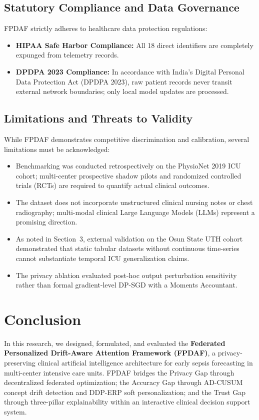 \documentclass[final,5p,times,twocolumn]{elsarticle}
\begin{document}
\subsection{Statutory Compliance and Data Governance}
FPDAF strictly adheres to healthcare data protection regulations:
\begin{itemize}
    \item \textbf{HIPAA Safe Harbor Compliance:} All 18 direct identifiers are completely expunged from telemetry records.
    \item \textbf{DPDPA 2023 Compliance:} In accordance with India's Digital Personal Data Protection Act (DPDPA 2023), raw patient records never transit external network boundaries; only local model updates are processed.
\end{itemize}

\subsection{Limitations and Threats to Validity}
While FPDAF demonstrates competitive discrimination and calibration, several limitations must be acknowledged:
\begin{itemize}
    \item Benchmarking was conducted retrospectively on the PhysioNet 2019 ICU cohort; multi-center prospective shadow pilots and randomized controlled trials (RCTs) are required to quantify actual clinical outcomes.
    \item The dataset does not incorporate unstructured clinical nursing notes or chest radiography; multi-modal clinical Large Language Models (LLMs) represent a promising direction.
    \item As noted in Section~3, external validation on the Osun State UTH cohort demonstrated that static tabular datasets without continuous time-series cannot substantiate temporal ICU generalization claims.
    \item The privacy ablation evaluated post-hoc output perturbation sensitivity rather than formal gradient-level DP-SGD with a Moments Accountant.
\end{itemize}

\section{Conclusion}
In this research, we designed, formulated, and evaluated the \textbf{Federated Personalized Drift-Aware Attention Framework (FPDAF)}, a privacy-preserving clinical artificial intelligence architecture for early sepsis forecasting in multi-center intensive care units. FPDAF bridges the Privacy Gap through decentralized federated optimization; the Accuracy Gap through AD-CUSUM concept drift detection and DDP-ERP soft personalization; and the Trust Gap through three-pillar explainability within an interactive clinical decision support system.
\end{document}
